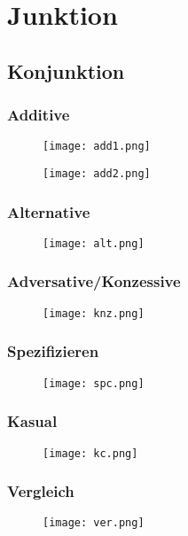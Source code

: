 \documentclass[UTF8]{report}
\begin{document}
\chapter{Junktion}


\section{Konjunktion}
\subsection{Additive}
\begin{figure}[H]
    \centering
    \texttt{[image: add1.png]}
\end{figure}
\begin{figure}[H]
    \centering
    \texttt{[image: add2.png]}
\end{figure}


\subsection{Alternative}
\begin{figure}[H]
    \centering
    \texttt{[image: alt.png]}
\end{figure}

\subsection{Adversative/Konzessive}
\begin{figure}[H]
    \centering
    \texttt{[image: knz.png]}
\end{figure}

\subsection{Spezifizieren}
\begin{figure}[H]
    \centering
    \texttt{[image: spc.png]}
\end{figure}

\subsection{Kasual}
\begin{figure}[H]
    \centering
    \texttt{[image: kc.png]}
\end{figure}

\subsection{Vergleich}
\begin{figure}[H]
    \centering
    \texttt{[image: ver.png]}
\end{figure}
\end{document}
